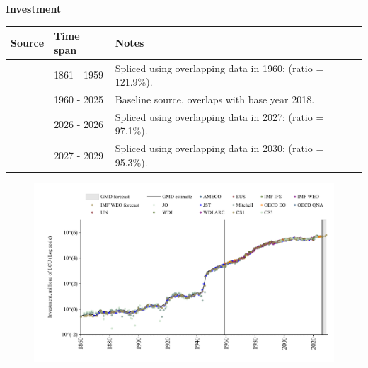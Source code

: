 \documentclass[12pt,a4paper,landscape]{article}
\begin{document}
\begin{adjustbox}{max totalsize={\paperwidth}{\paperheight},center}
\begin{minipage}[t][\textheight][t]{\textwidth}
\vspace*{0.5cm}
{}
\begin{center}
{\Large\bfseries Investment}
\end{center}
\vspace{0.5cm}
\begin{table}[H]
\centering
\small
\begin{tabular}{|l|l|l|}
\hline
\textbf{Source} & \textbf{Time span} & \textbf{Notes} \\
\hline
\rowcolor{white}\cite{CS1_ITA}& 1861 - 1959 &Spliced using overlapping data in 1960: (ratio = 121.9\%). \\
\rowcolor{lightgray}\cite{OECD_EO}& 1960 - 2025 &Baseline source, overlaps with base year 2018. \\
\rowcolor{white}\cite{AMECO}& 2026 - 2026 &Spliced using overlapping data in 2027: (ratio = 97.1\%). \\
\rowcolor{lightgray}\cite{IMF_WEO_forecast}& 2027 - 2029 &Spliced using overlapping data in 2030: (ratio = 95.3\%). \\
\hline
\end{tabular}
\end{table}
\begin{figure}[H]
\centering
\includegraphics[width=\textwidth,height=0.6\textheight,keepaspectratio]{graphs/ITA_inv.pdf}
\end{figure}
\end{minipage}
\end{adjustbox}
\end{document}
